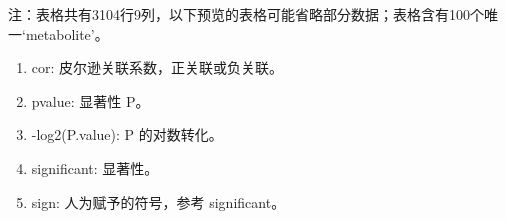 \documentclass[
]{article}
\providecommand{\tightlist}{%
  \setlength{\itemsep}{0pt}\setlength{\parskip}{0pt}}
\begin{document}
\begin{center}\begin{tcolorbox}[colback=gray!10, colframe=gray!50, width=0.9\linewidth, arc=1mm, boxrule=0.5pt]注：表格共有3104行9列，以下预览的表格可能省略部分数据；表格含有100个唯一`metabolite'。
\end{tcolorbox}
\end{center}
\begin{center}\begin{tcolorbox}[colback=gray!10, colframe=gray!50, width=0.9\linewidth, arc=1mm, boxrule=0.5pt]\begin{enumerate}\tightlist
\item cor:  皮尔逊关联系数，正关联或负关联。
\item pvalue:  显著性 P。
\item -log2(P.value):  P 的对数转化。
\item significant:  显著性。
\item sign:  人为赋予的符号，参考 significant。
\end{enumerate}\end{tcolorbox}
\end{center}
\end{document}
